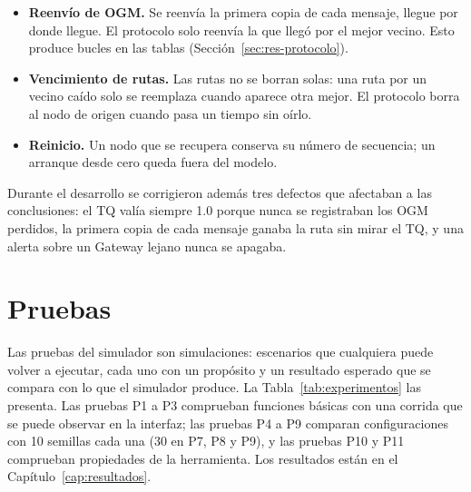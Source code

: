 \begin{itemize}
\item \textbf{Reenvío de OGM.} Se reenvía la primera copia de cada mensaje,
llegue por donde llegue. El protocolo solo reenvía la que llegó por el mejor
vecino. Esto produce bucles en las tablas (Sección~\ref{sec:res-protocolo}).
\item \textbf{Vencimiento de rutas.} Las rutas no se borran solas: una ruta por
un vecino caído solo se reemplaza cuando aparece otra mejor. El protocolo borra
al nodo de origen cuando pasa un tiempo sin oírlo.
\item \textbf{Reinicio.} Un nodo que se recupera conserva su número de
secuencia; un arranque desde cero queda fuera del modelo.
\end{itemize}

Durante el desarrollo se corrigieron además tres defectos que afectaban a las
conclusiones: el TQ valía siempre 1.0 porque nunca se registraban los OGM
perdidos, la primera copia de cada mensaje ganaba la ruta sin mirar el TQ, y
una alerta sobre un Gateway lejano nunca se apagaba.

\section{Pruebas}
\label{sec:pruebas}

Las pruebas del simulador son simulaciones: escenarios que cualquiera puede
volver a ejecutar, cada uno con un propósito y un resultado esperado que se
compara con lo que el simulador produce. La Tabla~\ref{tab:experimentos} las
presenta. Las pruebas P1 a P3 comprueban funciones básicas con una corrida que
se puede observar en la interfaz; las pruebas P4 a P9 comparan configuraciones
con 10 semillas cada una (30 en P7, P8 y P9), y las pruebas P10 y P11 comprueban propiedades de la
herramienta. Los resultados están en el Capítulo~\ref{cap:resultados}.

